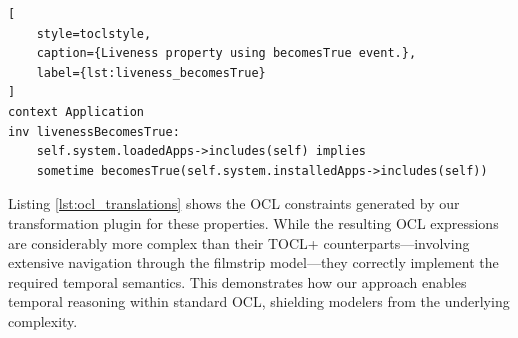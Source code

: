 \begin{lstlisting}[
    style=toclstyle,
    caption={Liveness property using becomesTrue event.},
    label={lst:liveness_becomesTrue}
]
context Application
inv livenessBecomesTrue:
    self.system.loadedApps->includes(self) implies
    sometime becomesTrue(self.system.installedApps->includes(self))
\end{lstlisting}

Listing \ref{lst:ocl_translations} shows 
the OCL constraints generated by our transformation plugin for these properties. 
While the resulting OCL expressions are considerably more complex than their TOCL+ 
counterparts—involving extensive navigation through the filmstrip model—they 
correctly implement the required temporal semantics. This demonstrates how our 
approach enables temporal reasoning within standard OCL, shielding modelers 
from the underlying complexity.

